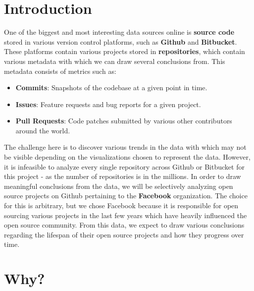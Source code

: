 \documentclass{article}
\begin{document}
\begin{titlepage}
\begin{center}
        \vspace{1in}
        \vfill
        
    \end{center}
\end{titlepage}

\tableofcontents

\newpage

\section {Introduction}

One of the biggest and most interesting data sources online is \textbf{source code} stored in various version control platforms, such as \textbf{Github} and \textbf{Bitbucket}. These platforms contain various projects stored in \textbf{repositories}, which contain various metadata with which we can draw several conclusions from. This metadata consists of metrics such as:

\begin{itemize}
	\item \textbf{Commits}: Snapshots of the codebase at a given point in time.
	\item \textbf{Issues}: Feature requests and bug reports for a given project.
	\item \textbf{Pull Requests}: Code patches submitted by various other contributors  around the world.
\end{itemize}

The challenge here is to discover various trends in the data with which may not be visible depending on the visualizations chosen to represent the data. However, it is infeasible to analyze every single repository across Github or Bitbucket for this project - as the number of repositories is in the millions. In order to draw meaningful conclusions from the data, we will be selectively analyzing open source projects on Github pertaining to the \textbf{Facebook} organization. The choice for this is arbitrary, but we chose Facebook because it is responsible for open sourcing various projects in the last few years which have heavily influenced the open source community. From this data, we expect to draw various conclusions regarding the lifespan of their open source projects and how they progress over time.

\section {Why?}
\end{document}
